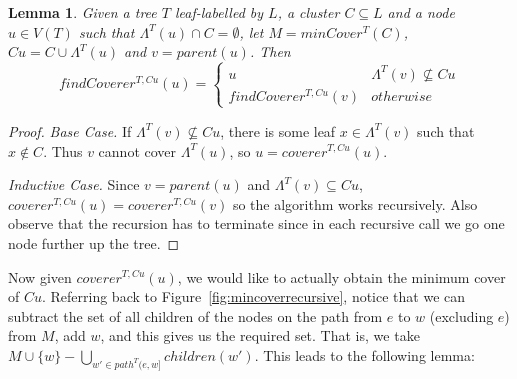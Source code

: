 \documentclass[final,1p,times]{elsarticle}
\newcommand{\leafset}{\Lambda}
\newtheorem{lemma}[theorem]{Lemma}
\begin{document}
    \begin{lemma}
        \label{lem:findcovererrecursive}
        Given a tree $T$ leaf-labelled by $L$, a cluster $C \subseteq L$ and a node $u \in V(T)$ such that $\leafset^{T}(u) \cap C = \emptyset$, let $M = minCover^{T}(C)$, $Cu = C \cup \leafset^{T}(u)$ and $v = parent(u)$. Then
        \[findCoverer^{T, Cu}(u) = \begin{cases}
            u & \leafset^{T}(v) \not\subseteq Cu\\
            findCoverer^{T, Cu}(v) & otherwise
        \end{cases}\]
    \end{lemma}
        \begin{proof}
            \textit{Base Case.} If $\leafset^{T}(v) \not\subseteq Cu$, there is some leaf $x \in \leafset^{T}(v)$ such that $x \not\in C$. Thus $v$ cannot cover $\leafset^{T}(u)$, so $u = coverer^{T, Cu}(u)$.

            \textit{Inductive Case.} Since $v = parent(u)$ and $\leafset^{T}(v) \subseteq Cu$, $coverer^{T, Cu}(u) = coverer^{T, Cu}(v)$ so the algorithm works recursively. Also observe that the recursion has to terminate since in each recursive call we go one node further up the tree.
        \end{proof}

    Now given $coverer^{T, Cu}(u)$, we would like to actually obtain the minimum cover of $Cu$. Referring back to Figure~\ref{fig:mincoverrecursive}, notice that we can subtract the set of all children of the nodes on the path from $e$ to $w$ (excluding $e$) from $M$, add $w$, and this gives us the required set. That is, we take $M \cup \{w\} - \bigcup_{w' \in path^{T}(e, w]} children(w')$. This leads to the following lemma:
    \newline
\end{document}
